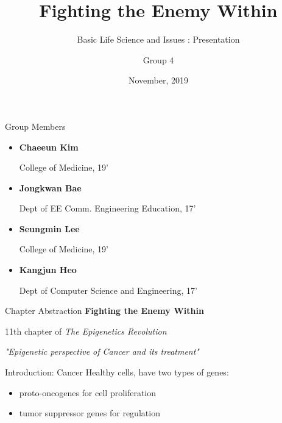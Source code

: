 \documentclass{beamer}
\title{Fighting the Enemy Within}
\subtitle{Basic Life Science and Issues : Presentation}
\author{Group 4}
\institute{Chungnam National University}
\date{November, 2019}
\begin{document}
    \begin{frame}[plain]{ }
        \maketitle
    \end{frame}

    \begin{frame}{Group Members}
        \begin{itemize}
            \item \textbf{Chaeeun Kim}

                  College of Medicine, 19'
            \item \textbf{Jongkwan Bae} 
            
                  Dept of EE Comm. Engineering Education, 17'
            \item \textbf{Seungmin Lee}
            
                  College of Medicine, 19'
            \item \textbf{Kangjun Heo}
            
                  Dept of Computer Science and Engineering, 17'
        \end{itemize}
    \end{frame}

    \begin{frame}{Chapter Abstraction}
        \textbf{Fighting the Enemy Within}
        
        11th chapter of \textit{The Epigenetics Revolution}

        \vspace{2.5em}

        \textit{"Epigenetic perspective of Cancer and its treatment"}
    \end{frame}

    \begin{frame}{Introduction: Cancer}
        Healthy cells, have two types of genes:
        \begin{itemize}
            \item proto-oncogenes for cell proliferation
            \item tumor suppressor genes for regulation
        \end{itemize}
    \end{frame}
\end{document}
